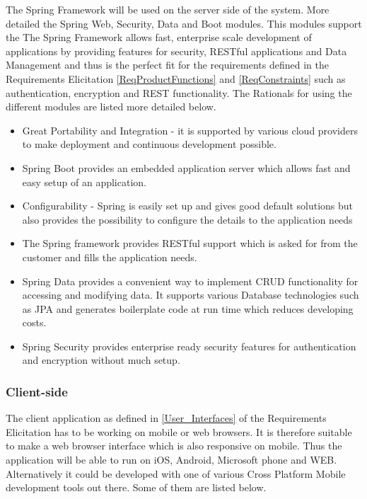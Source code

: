 \documentclass[a4paper,11pt]{article}
\begin{document}
The Spring Framework will be used on the server side of the system.
More detailed the Spring Web, Security, Data and Boot modules. This modules support the 
The Spring Framework allows fast, enterprise scale development of applications by providing features for security, RESTful applications and Data Management and thus is the perfect fit for the requirements defined in the Requirements Elicitation \ref{ReqProductFunctions} and \ref{ReqConstraints} such as authentication, encryption and REST functionality. The Rationals for using the different modules are listed more detailed below.
\begin{itemize}
\item Great Portability and Integration - it is supported by various cloud providers to make deployment and continuous development possible.
\item Spring Boot provides an embedded application server which allows fast and easy setup of an application.
\item Configurability - Spring is easily set up and gives good default solutions but also provides the possibility to configure the details to the application needs
\item The Spring framework provides RESTful support which is asked for from the customer and fills the application needs.
\item Spring Data provides a convenient way to implement CRUD functionality for accessing and modifying data. It supports various Database technologies such as JPA and generates boilerplate code at run time which reduces developing costs.
\item Spring Security provides enterprise ready security features for authentication and encryption without much setup.
\end{itemize}

\subsubsection{Client-side}
\noindent The client application as defined in \ref{User_Interfaces} of the Requirements Elicitation has to be working on mobile or web browsers. It is therefore suitable to make a web browser interface which is also responsive on mobile. Thus the application will be able to run on iOS, Android, Microsoft phone and WEB. Alternatively it could be developed with one of various Cross Platform Mobile development tools out there. Some of them are listed below.
\end{document}
